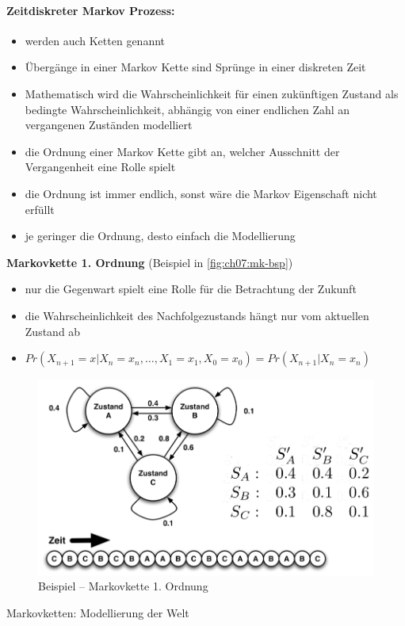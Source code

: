 \paragraph{Zeitdiskreter Markov Prozess:}
\begin{itemize}
\item werden auch Ketten genannt
\item \"Uberg\"ange in einer Markov Kette sind Spr\"unge in einer diskreten Zeit
\item Mathematisch wird die Wahrscheinlichkeit f\"ur einen zuk\"unftigen Zustand als bedingte Wahrscheinlichkeit, abh\"angig von einer endlichen Zahl an vergangenen Zust\"anden modelliert
\item die Ordnung einer Markov Kette gibt an, welcher Ausschnitt der Vergangenheit eine Rolle spielt
\item die Ordnung ist immer endlich, sonst w\"are die Markov Eigenschaft nicht erf\"ullt
\item je geringer die Ordnung, desto einfach die Modellierung
\end{itemize}
\newpage
\textbf{Markovkette 1. Ordnung} (Beispiel in \autoref{fig:ch07:mk-bsp})
\begin{itemize}
\item nur die Gegenwart spielt eine Rolle f\"ur die Betrachtung der Zukunft
\item die Wahrscheinlichkeit des Nachfolgezustands h\"angt nur vom aktuellen Zustand ab
\item $Pr(X_{n+1} = x | X_n = x_n, \ldots, X_1 = x_1, X_0 = x_0) = Pr(X_{n+1}|X_n = x_n)$
\end{itemize}
\begin{figure}
	\centering
  	\includegraphics[width=0.5\linewidth]{figures/ch07_mk-bsp.png}
	\caption{Beispiel -- Markovkette 1. Ordnung}
	\label{fig:ch07:mk-bsp}
\end{figure}
Markovketten: Modellierung der Welt
